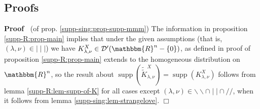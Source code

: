 \documentclass[12pt]{article}
\newcommand{\tmop}[1]{\ensuremath{\operatorname{#1}}}
\renewenvironment{proof}{\noindent\textbf{Proof\ }}{\hspace*{\fill}$\Box$\medskip}
\theoremstyle{remark}
\begin{document}
\subsection{Proofs}

\begin{proof}
  (of prop. \ref{supp-sing:prop-supp-mmm}) The information in proposition
  \ref{supp-R:prop-main} implies that under the given assumptions (that is,
  $(\lambda, \nu) \in \mid \mid \mid$) we have $K_{\lambda, \nu}^X \in
  \mathcal{D}' (\mathbbm{R}^n - \{ 0 \})$, as defined in proof of proposition
  \ref{supp-R:prop-main} extends to the homogeneous distribution on
  $\mathbbm{R}^n$, so the result about $\tmop{supp}
  (\widetilde{\tilde{K}}_{\lambda, \nu}^X) = \tmop{supp} (K_{\lambda, \nu}^X)$
  follows from lemma \ref{supp-R:lem-supp-of-K} for all cases except
  $(\lambda, \nu) \in \backslash\backslash \cap \mid \mid \cap / /$, when it
  follows from lemma \ref{supp-sing:lem-strangelove}.
\end{proof}
\end{document}
